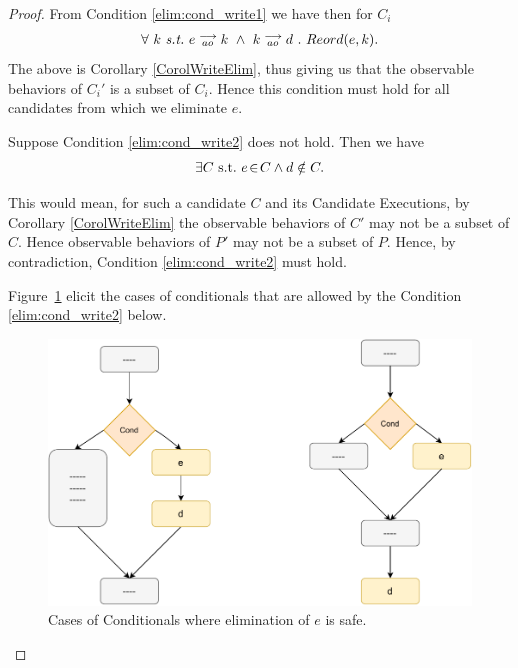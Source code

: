     \begin{proof}
    
        From Condition \ref{elim:cond_write1} we have then for $C_i$
        \begin{align*}
            \forall \ k \ \textit{s.t.} \ 
            \reln{e}{ao}{k} \ \wedge \ \reln{k}{ao}{d} \ . \ 
            Reord(e,k).
        \end{align*}
        The above is Corollary \ref{CorolWriteElim}, thus giving us that the observable behaviors of $C_i'$ is a subset of $C_i$. 
        Hence this condition must hold for all candidates from which we eliminate $e$. 
    
        Suppose Condition \ref{elim:cond_write2} does not hold. 
        Then we have 
        \begin{align*}
            \exists C \ \text{s.t.} \  e\!\in\!C \wedge d \notin C.
        \end{align*}
    
        This would mean, for such a candidate $C$ and its Candidate Executions, by Corollary \ref{CorolWriteElim} the observable behaviors of $C'$ may not be a subset of $C$. 
        Hence observable behaviors of $P'$ may not be a subset of $P$.
        Hence, by contradiction, Condition \ref{elim:cond_write2} must hold\footnotemark. 
    
        
        Figure~\ref{elim:cond} elicit the cases of conditionals that are allowed by the Condition \ref{elim:cond_write2} below.
        \begin{figure}[H]
            \centering
            \includegraphics[scale=0.7]{5.Elimination/2.ValidEliminationProgram/Conditionals/ConditionalsCases.pdf}
            \caption{Cases of Conditionals where elimination of $e$ is safe.}
            \label{elim:cond}
        \end{figure}
    
    \end{proof}
    
